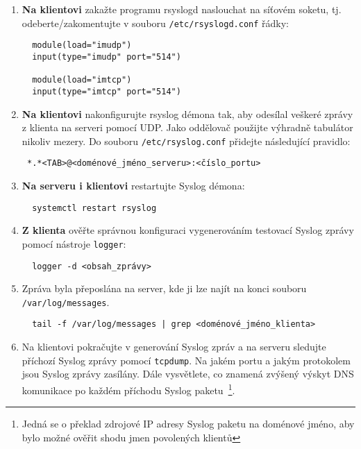 \begin{itemize}
\begin{enumerate}
            \item {\bf Na klientovi} zakažte programu rsyslogd naslouchat na síťovém soketu,
tj. odeberte/zakomentujte v souboru {\tt /etc/rsyslogd.conf} řádky:
\begin{verbatim}
  module(load="imudp")
  input(type="imudp" port="514")

  module(load="imtcp")
  input(type="imtcp" port="514")
\end{verbatim} 

            \item {\bf Na klientovi} nakonfigurujte rsyslog démona tak, aby odesílal veškeré zprávy
         z klienta na serveri pomocí UDP. Jako oddělovač použijte výhradně tabulátor nikoliv mezery.
         Do souboru {\tt /etc/rsyslog.conf} přidejte následující pravidlo:
\begin{verbatim} 
 *.*<TAB>@<doménové_jméno_serveru>:<číslo_portu>
\end{verbatim}

            \item {\bf Na serveru i klientovi} restartujte Syslog démona: 
\begin{verbatim}
  systemctl restart rsyslog
\end{verbatim} 

            \item {\bf Z klienta} ověřte správnou konfiguraci vygenerováním testovací Syslog 
         zprávy pomocí nástroje {\tt logger}:
\begin{verbatim} 
  logger -d <obsah_zprávy>
\end{verbatim} 
        
            \item Zpráva byla přeposlána na server, kde ji lze najít na konci souboru
         {\tt /var/log/messages}.

\begin{verbatim} 
  tail -f /var/log/messages | grep <doménové_jméno_klienta>
\end{verbatim} 

            \item  Na klientovi pokračujte v generování Syslog zpráv a 
         na serveru sledujte příchozí Syslog zprávy pomocí {\tt tcpdump}. Na jakém
         portu a jakým protokolem jsou Syslog zprávy zasílány. Dále vysvětlete,
         co znamená zvýšený výskyt DNS komunikace po každém příchodu Syslog
         paketu~\footnote{Jedná se o překlad zdrojové IP adresy Syslog paketu na doménové
         jméno, aby bylo možné ověřit shodu jmen povolených klientů}.


\end{enumerate}
\end{itemize}
